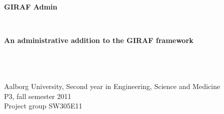\thispagestyle{empty}
\begin{center}
	\hrulefill\newline
	\\
	\begin{LARGE}	
	\textbf{GIRAF Admin}
	\end{LARGE}
	\\
	\begin{large} 
	\textbf{An administrative addition to the GIRAF framework}
	\end{large}\\
	\hrulefill\newline
	\\~\\
	Aalborg University, Second year in Engineering, Science and Medicine\\
	P3, fall semester 2011	\\
	Project group SW305E11\\
\end{center}